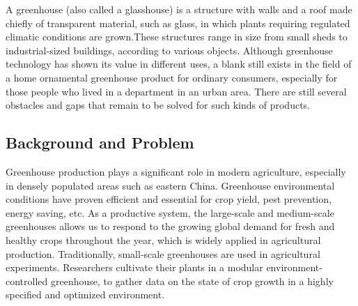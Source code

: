 A greenhouse (also called a glasshouse) is a structure with walls and a roof made chiefly of transparent material, such as glass, in which plants requiring regulated climatic conditions are grown.\cite{greenhouse}These structures range in size from small sheds to industrial-sized buildings, according to various objects. Although greenhouse technology has shown its value in different uses, a blank still exists in the field of a home ornamental greenhouse product for ordinary consumers, especially for those people who lived in a department in an urban area. There are still several obstacles and gaps that remain to be solved for such kinds of products.

\subsection{Background and Problem}
Greenhouse production plays a significant role in modern agriculture, especially in densely populated areas such as eastern China. Greenhouse environmental conditions have proven efficient and essential for crop yield, pest prevention, energy saving, etc.\cite{LI2020105096} As a productive system, the large-scale and medium-scale greenhouses allows us to respond to the growing global demand for fresh and healthy crops throughout the year, which is widely applied in agricultural production.\cite{rizwan2022optimal} Traditionally, small-scale greenhouses are used in agricultural experiments. Researchers cultivate their plants in a modular environment-controlled greenhouse, to gather data on the state of crop growth in a highly specified and optimized environment.

